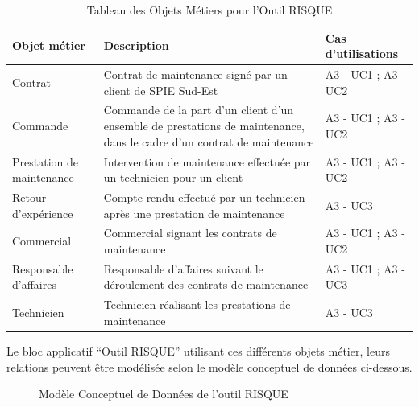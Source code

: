 \begin{table}[H]
    \begin{tabular}{p{3cm}|p{10cm}|p{3cm}}
    Objet métier & Description & Cas d'utilisations \\ \hline
    Contrat & Contrat de maintenance signé par un client de SPIE Sud-Est & A3 - UC1 ; A3 - UC2 \\ \hline
    Commande & Commande de la part d’un client d’un ensemble de prestations de maintenance, dans le cadre d’un contrat de maintenance & A3 - UC1 ; A3 - UC2 \\ \hline
    Prestation de maintenance & Intervention de maintenance effectuée par un technicien pour un client & A3 - UC1 ; A3 - UC2 \\ \hline
    Retour d’expérience & Compte-rendu effectué par un technicien après une prestation de maintenance & A3 - UC3 \\ \hline
    Commercial & Commercial signant les contrats de maintenance & A3 - UC1 ; A3 - UC2 \\ \hline
    Responsable d’affaires & Responsable d’affaires suivant le déroulement des contrats de maintenance & A3 - UC1 ; A3 - UC3 \\ \hline
    Technicien & Technicien réalisant les prestations de maintenance & A3 - UC3 \\
    \end{tabular}
    \caption{Tableau des Objets Métiers pour l'Outil RISQUE}
\end{table}

Le bloc applicatif “Outil RISQUE” utilisant ces différents objets métier, leurs relations peuvent être modélisée selon le modèle conceptuel de données ci-dessous.

\begin{figure}[H]
    \label{fig-om-risque}
    \noindent{}
    \caption{Modèle Conceptuel de Données de l'outil RISQUE}
\end{figure}

